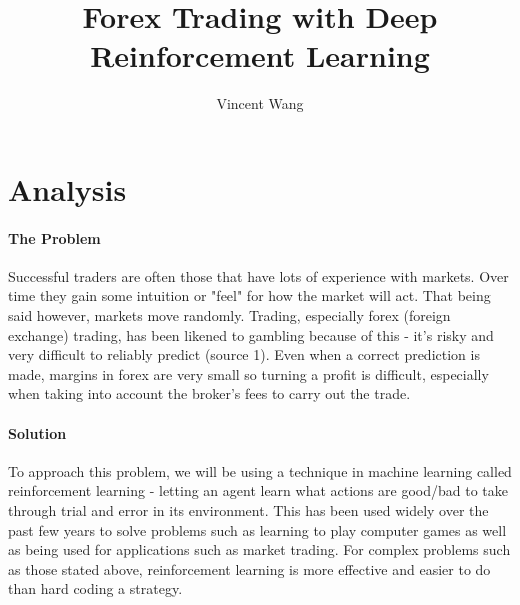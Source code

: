 \documentclass{article}
\title{Forex Trading with Deep Reinforcement Learning}
\author{Vincent Wang}
\begin{document}
	\maketitle
	\newpage
	
	\section{Analysis}
		
		
\iffalse
Fully or nearly fully scoped analysis of a real problem, presented in a way that a third party can understand.

Requirements fully documented in a set of measurable and appropriate specific objectives, covering all required functionality of the solution or areas of investigation.

Requirements arrived at by considering, through dialogue, the needs of the intended users of the system, or recipients of the outcomes for investigative projects.

Problem sufficiently well modelled to be of use in subsequent stages.		
\fi
		

		\paragraph{The Problem} Successful traders are often those that have lots of experience with markets. Over time they gain some intuition or "feel" for how the market will act. That being said however, markets move randomly. Trading, especially forex (foreign exchange) trading, has been likened to gambling because of this - it's risky and very difficult to reliably predict (source 1). Even when a correct prediction is made, margins in forex are very small so turning a profit is difficult, especially when taking into account the broker's fees to carry out the trade. 
		

		\paragraph{Solution} To approach this problem, we will be using a technique in machine learning called reinforcement learning - letting an agent learn what actions are good/bad to take through trial and error in its environment. This has been used widely over the past few years to solve problems such as learning to play computer games as well as being used for applications such as market trading. For complex problems such as those stated above, reinforcement learning is more effective and easier to do than hard coding a strategy. 
	
\end{document}
